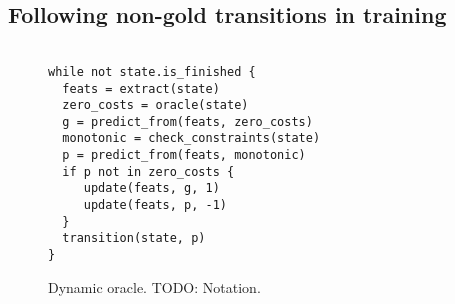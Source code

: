 \documentclass[11pt,letterpaper]{article}
\newcommand{\maybe}[1]{\textcolor{gray}{#1}}
\newcommand{\note}[1]{\textcolor{red}{#1}}
\begin{document}
%
%
%
%
%
\subsection{Following non-gold transitions in training}
\begin{figure}
\centering
    \begin{verbatim}

while not state.is_finished {
  feats = extract(state)
  zero_costs = oracle(state)
  g = predict_from(feats, zero_costs)
  monotonic = check_constraints(state)
  p = predict_from(feats, monotonic)
  if p not in zero_costs {
     update(feats, g, 1)
     update(feats, p, -1)
  }
  transition(state, p)
}
\end{verbatim}
\caption{Dynamic oracle. TODO: Notation.}
\end{figure}
\end{document}
